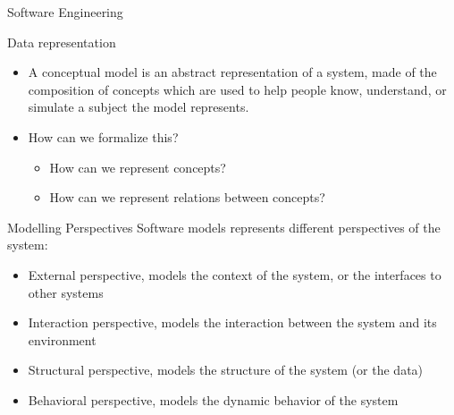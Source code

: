 \documentclass[slidetop,mathserif,red]{beamer}
\begin{document}
\begin{frame}{Software Engineering}
\end{frame}




\begin{frame}{Data representation}
    \begin{itemize}
    \item A conceptual model is an abstract representation of a system, made of the composition of concepts which are used to help people know, understand, or simulate a subject the model represents. 
     \item How can we formalize this?
    	 	\begin{itemize}
      	\item How can we represent concepts?
      	\item How can we represent relations between concepts?
     	\end{itemize}
    \end{itemize}
\end{frame}



\begin{frame}{Modelling Perspectives}
    Software models represents different perspectives of the system:


        \begin{itemize}
        \item External perspective, models the context of the system, or the interfaces to other systems 

        \item Interaction perspective, models the interaction between the system and its environment

        \item Structural perspective, models the structure of the system (or the data)

        \item Behavioral perspective, models the dynamic behavior of the system
        \end{itemize}
\end{frame}
\end{document}
